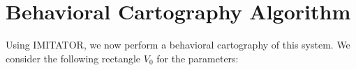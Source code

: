 \documentclass[a4paper,11pt]{report}
\newcommand{\imitator}{\textsf{IMITATOR}}
\begin{document}
% 
% 
% 
% 
% 
% 
% 
% 
% 
% 
% 
% 
% 
% 
% 
% 

\section{Behavioral Cartography Algorithm}


Using \imitator{}, we now perform a behavioral cartography of this system.
We consider the following rectangle $V_0$ for the parameters:
\end{document}
